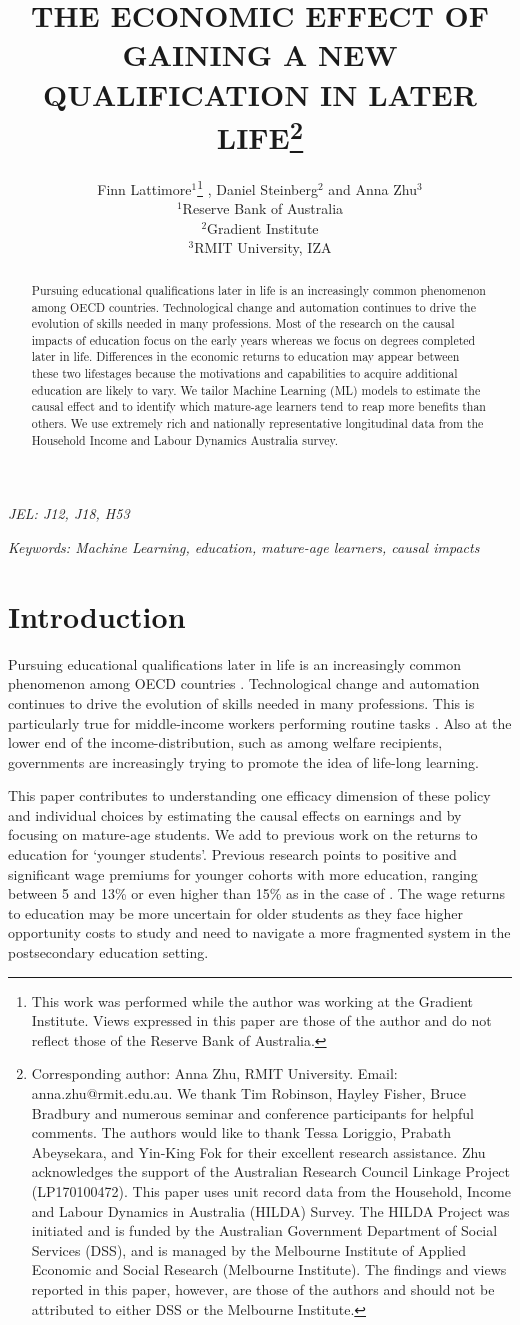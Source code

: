 \documentclass[12pt, a4paper]{article}
\title{THE ECONOMIC EFFECT OF GAINING A NEW QUALIFICATION IN LATER LIFE\thanks{\scriptsize{Corresponding author: Anna Zhu, RMIT University. Email: anna.zhu@rmit.edu.au. \newline \newline We thank Tim Robinson, Hayley Fisher, Bruce Bradbury and numerous seminar and conference participants for helpful comments. The authors would like to thank Tessa Loriggio, Prabath Abeysekara, and Yin-King Fok for their excellent research assistance. \newline \newline Zhu acknowledges the support of the Australian Research Council Linkage Project (LP170100472). This paper uses unit record data from the Household, Income and Labour Dynamics in Australia (HILDA) Survey. The HILDA Project was initiated and is funded by the Australian Government Department of Social Services (DSS), and is managed by the Melbourne Institute of Applied Economic and Social Research (Melbourne Institute). The findings and views reported in this paper, however, are those of the authors and should not be attributed to either DSS or the Melbourne Institute.}}} \vspace{0.2cm} \author{Finn Lattimore$^1$\thanks{\scriptsize{This work was performed while the author was working at the Gradient Institute. Views expressed in this paper are those of the author and do not reflect those of the Reserve Bank of Australia.}}\vspace{0.2cm} ,  Daniel Steinberg$^2$ and Anna Zhu$^3$ \\\small {$^1$Reserve Bank of Australia} \vspace{0.2cm} \\ {$^2$Gradient Institute} \vspace{0.2cm} \\ {$^3$RMIT University, IZA}}
\begin{document}

\maketitle


\begin{abstract}

Pursuing educational qualifications later in life is an increasingly common phenomenon among OECD countries. Technological change and automation continues to drive the evolution of skills needed in many professions. Most of the research on the causal impacts of education focus on the early years whereas we focus on degrees completed later in life. Differences in the economic returns to education may appear between these two lifestages because the motivations and capabilities to acquire additional education are likely to vary. We tailor Machine Learning (ML) models to estimate the causal effect and to identify which mature-age learners tend to reap more benefits than others. We use extremely rich and nationally representative longitudinal data from the Household Income and Labour Dynamics Australia survey.

\end{abstract}


\emph{JEL: J12, J18, H53}

\emph{Keywords: Machine Learning, education, mature-age learners, causal impacts}


\clearpage
\onehalfspacing


\section{Introduction}

Pursuing educational qualifications later in life is an increasingly common phenomenon among OECD countries \citep{oecd2016}. Technological change and automation continues to drive the evolution of skills needed in many professions. This is particularly true for middle-income workers performing routine tasks \citep{autor2008,acemoglu2011}. Also at the lower end of the income-distribution, such as among welfare recipients, governments are increasingly trying to promote the idea of life-long learning. 

This paper contributes to understanding one efficacy dimension of these policy and individual choices by estimating the causal effects on earnings and by focusing on mature-age students. We add to previous work on the returns to education for `younger students'. Previous research points to positive and significant wage premiums for younger cohorts with more education, ranging between 5 and 13\% \citep{angrist1991,harmon2003,machin2006} or even higher than 15\% as in the case of \cite{harmon1995}. The wage returns to education may be more uncertain for older students as they face higher opportunity costs to study and need to navigate a more fragmented system in the postsecondary education setting.
\end{document}
